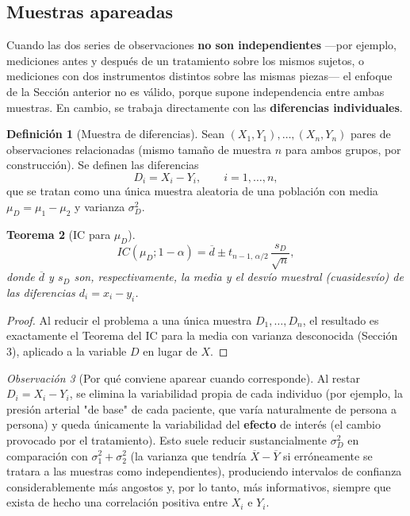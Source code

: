 \documentclass[11pt,a4paper]{article}
\theoremstyle{plain}
\newtheorem{teorema}{Teorema}[section]
\theoremstyle{definition}
\newtheorem{definicion}[teorema]{Definición}
\theoremstyle{remark}
\newtheorem{observacion}[teorema]{Observación}
\begin{document}
\subsection{Muestras apareadas}
\label{sec:apareadas}

Cuando las dos series de observaciones \textbf{no son independientes} —por ejemplo, mediciones antes y después de un tratamiento sobre los mismos sujetos, o mediciones con dos instrumentos distintos sobre las mismas piezas— el enfoque de la Sección anterior no es válido, porque supone independencia entre ambas muestras. En cambio, se trabaja directamente con las \textbf{diferencias individuales}.

\begin{definicion}[Muestra de diferencias]
Sean $(X_1,Y_1),\dots,(X_n,Y_n)$ pares de observaciones relacionadas (mismo tamaño de muestra $n$ para ambos grupos, por construcción). Se definen las diferencias
\[
D_i = X_i-Y_i, \qquad i=1,\dots,n,
\]
que se tratan como una única muestra aleatoria de una población con media $\mu_D=\mu_1-\mu_2$ y varianza $\sigma_D^2$.
\end{definicion}

\begin{teorema}[IC para $\mu_D$]
\[
IC(\mu_D;1-\alpha) = \overline d \pm t_{n-1,\,\alpha/2}\,\frac{s_D}{\sqrt n},
\]
donde $\overline d$ y $s_D$ son, respectivamente, la media y el desvío muestral (cuasidesvío) de las diferencias $d_i=x_i-y_i$.
\end{teorema}

\begin{proof}
Al reducir el problema a una única muestra $D_1,\dots,D_n$, el resultado es exactamente el Teorema del IC para la media con varianza desconocida (Sección 3), aplicado a la variable $D$ en lugar de $X$.
\end{proof}

\begin{observacion}[Por qué conviene aparear cuando corresponde]
Al restar $D_i=X_i-Y_i$, se elimina la variabilidad propia de cada individuo (por ejemplo, la presión arterial "de base" de cada paciente, que varía naturalmente de persona a persona) y queda únicamente la variabilidad del \textbf{efecto} de interés (el cambio provocado por el tratamiento). Esto suele reducir sustancialmente $\sigma_D^2$ en comparación con $\sigma_1^2+\sigma_2^2$ (la varianza que tendría $\overline X-\overline Y$ si erróneamente se tratara a las muestras como independientes), produciendo intervalos de confianza considerablemente más angostos y, por lo tanto, más informativos, siempre que exista de hecho una correlación positiva entre $X_i$ e $Y_i$.
\end{observacion}
\end{document}
